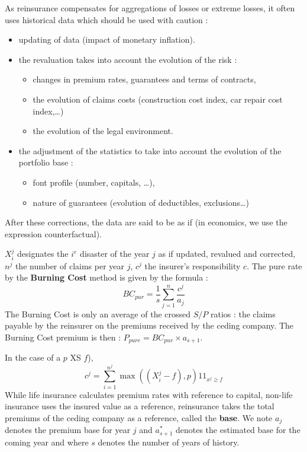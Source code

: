 \begin{f}
	[Reinsurance data ]

As reinsurance compensates for aggregations of losses or extreme losses, it often uses historical data which should be used with caution :
\begin{itemize}
	\item updating of data (impact of monetary inflation).
	\item the revaluation takes into account the evolution of the risk :
	\begin{itemize}
		\item changes in premium rates, guarantees and terms of contracts,
		\item the evolution of claims costs (construction cost index, car repair cost index,\ldots)
		\item the evolution of the legal environment.
	\end{itemize}
	\item the adjustment of the statistics to take into account the evolution of the portfolio base :
	\begin{itemize}
		\item font profile (number, capitals, \ldots),
		\item nature of guarantees (evolution of deductibles, exclusions\ldots)
	\end{itemize}
\end{itemize}
After these corrections, the data are said to be \og as if \fg (in economics, we use the expression counterfactual).

\end{f}


\begin{f}
	
	$X_{i}^{j}$ designates the $i^{e}$ disaster of the year $j$ \og{}as if\fg{} updated, revalued and corrected,
$n^j$ the number of claims per year $j$, $c^{j}$ the insurer's responsibility $c$.
The pure rate by the \textbf{Burning Cost} method is given by the formula :
$$
BC_{pur}=\frac{1}{s}\sum_{j=1}^{n}\frac{c^{j}}{a_{j}}
$$ 
The Burning Cost is only an average of the crossed $S/P$ ratios : the claims payable by the reinsurer on the premiums received by the ceding company.
The Burning Cost premium is then : $P_{pure}=BC_{pur}\times a_{s+1}$.

In the case of a $p$ XS $f$), $$
c^{j}=\sum_{i=1}^{n^j}\max\left(  \left( X_{i}^{j}-f\right),p\right) 1\!\!1_{x^{j}\geq f}
$$
While life insurance calculates premium rates with reference to capital, non-life insurance uses the insured value as a reference, reinsurance takes the total premiums of the ceding company as a reference, called the \textbf{base}.
We note $a_{j}$ denotes the premium base for year $j$ and $a_{s+1}^{*}$ denotes the estimated base for the coming year and where $s$ denotes the number of years of history.
\end{f}



